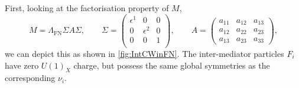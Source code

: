 \documentclass[11pt,letterpaper]{article}
\begin{document}
First, looking at the factorisation property of $M$,
\begin{equation}
    \label{eqn:MajoranaMatrixFact2}
M = \Lambda_{\text{FN}}\Sigma A \Sigma, \qquad 
    \Sigma = \begin{pmatrix}
    \epsilon^{1} & 0 & 0 \\
     0 & \epsilon^2 & 0 \\
     0 & 0 & 1 \\
    \end{pmatrix}, \qquad
A =     \begin{pmatrix}
        a_{11} & a_{12}  & a_{13} \\
        a_{12} & a_{22}  & a_{23} \\
        a_{13} & a_{23} & a_{33} 
    \end{pmatrix},
\end{equation} 
we can depict this as shown in \cref{fig:IntCWinFN}. The inter-mediator particles $F_{i}$ have zero $U(1)_X$ charge, but possess the same global symmetries as the corresponding $\nu_i$.
\end{document}
